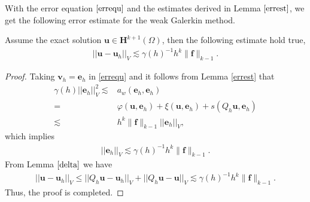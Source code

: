 \documentclass[leqno,CJK]{siamltex704}
\numberwithin{equation}{section}
\def\b0{\boldsymbol{0}}
\def\bPhi{\boldsymbol{\Phi}}            %
\def\bu{{\mathbf{u}}}
\def\bv{{\mathbf{v}}}
\def\bh{{\mathbf{H}}}
\def\bn{{\mathbf{n}}}
\def\be{{\mathbf{e}}}
\def\bf{{\mathbf{f}}}
\newcommand{\di}{\text{div}}
\begin{document}
With the error equation $\eqref{errequ}$ and the estimates derived in Lemma $\ref{errest}$, we get the following error estimate for the weak Galerkin method.
\begin{lemma}\label{Vnorm}
	Assume the exact solution $\bu\in\bh^{k+1}(\Omega)$, then the following estimate hold true,
	\begin{align}
		||\bu-\bu_h||_V\lesssim\gamma(h)^{-1}h^k\|\bf\|_{k-1}.
	\end{align}
\end{lemma}
\begin{proof}
	Taking $\bv_h=\be_h$ in \eqref{errequ} and it follows from Lemma \ref{errest} that
	\begin{align*}
		\gamma(h)||\be_h||_V^2\lesssim& 
		a_w(\be_h,\be_h)
		\\
		=&
		\varphi(\bu,\be_h)+\xi(\bu,\be_h)+s(Q_h\bu,\be_h)
		\\
		\lesssim&
		h^k\|\bf\|_{k-1}||\be_h||_V,
	\end{align*}
	which implies
	\begin{eqnarray*}
		||\be_h||_V\lesssim\gamma(h)^{-1}h^k\|\bf\|_{k-1}.
	\end{eqnarray*}
	From Lemma $\ref{delta}$ we have
	\begin{eqnarray*}
		||\bu-\bu_h||_V\leq||Q_h\bu-\bu_h||_V+||Q_h\bu-\bu||_V\lesssim \gamma(h)^{-1}h^k\|\bf\|_{k-1}.
	\end{eqnarray*}
	Thus, the proof is completed.
\end{proof}

\end{document}
